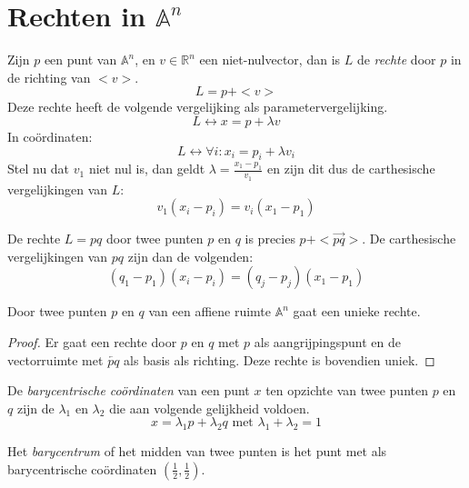 \documentclass[main.tex]{subfiles}
\begin{document}
\section{Rechten in $\mathbb{A}^{n}$}
\begin{de}
  \label{de:rechte}
  Zijn $p$ een punt van $\mathbb{A}^{n}$, en $v\in \mathbb{R}^{n}$ een niet-nulvector, dan is $L$ de \emph{rechte} door $p$ in de richting van $<v>$.
  \[
  L = p + <v>
  \]
  Deze rechte heeft de volgende vergelijking als parametervergelijking.
  \[
  L \leftrightarrow x = p + \lambda v
  \]
  In co\"ordinaten:
  \[
  L \leftrightarrow \forall i: x_{i} = p_{i} + \lambda v_{i}
  \]
  Stel nu dat $v_{1}$ niet nul is, dan geldt $\lambda = \frac{x_{1}-p_{1}}{v_{1}}$ en zijn dit dus de carthesische vergelijkingen van $L$:
  \[
  v_{1}(x_{i}-p_{i}) = v_{i}(x_{1}-p_{1})
  \]
\end{de}

\begin{st}
  De rechte $L=pq$ door twee punten $p$ en $q$ is precies $p + <\vec{pq}>$.
  De carthesische vergelijkingen van $pq$ zijn dan de volgenden:
  \[
  (q_{1}-p_{1})(x_{i}-p_{i}) = (q_{j}-p_{j})(x_{1}-p_{1})
  \]

\end{st}


\begin{st}
  \label{st:unieke-rechte-door-twee-punten}
  Door twee punten $p$ en $q$ van een affiene ruimte $\mathbb{A}^{n}$ gaat een unieke rechte.

  \begin{proof}
    Er gaat een rechte door $p$ en $q$ met $p$ als aangrijpingspunt en de vectorruimte met $\overleftarrow{pq}$ als basis als richting.
    Deze rechte is bovendien uniek.
  \end{proof}
\end{st}

\begin{de}
  De \emph{barycentrische co\"ordinaten} van een punt $x$ ten opzichte van twee punten $p$ en $q$ zijn de $\lambda_{1}$ en $\lambda_{2}$ die aan volgende gelijkheid voldoen.
  \[ x = \lambda_{1}p + \lambda_{2}q \text{ met } \lambda_{1} + \lambda_{2} = 1 \]
\end{de}

\begin{de}
  Het \emph{barycentrum} of het midden van twee punten is het punt met als barycentrische co\"ordinaten $(\frac{1}{2},\frac{1}{2})$.
\end{de}
\end{document}
